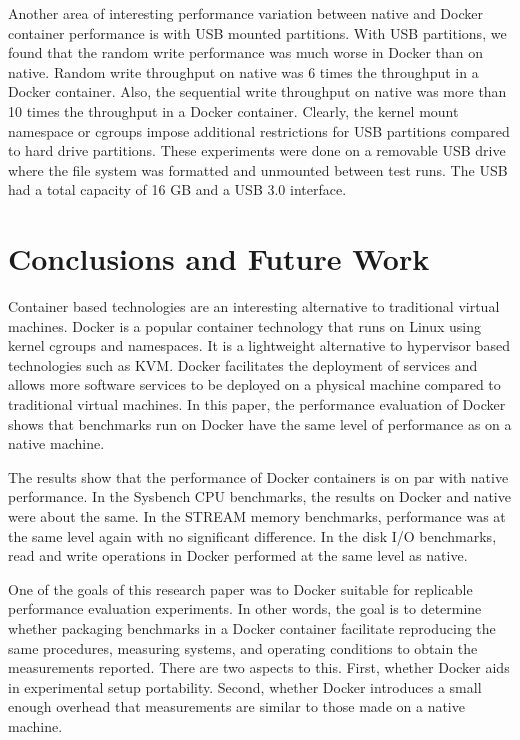 \documentclass[11pt]{article}
\begin{document}
	Another area of interesting performance variation between native and Docker container performance is with USB mounted partitions. With USB partitions, we found that the random write performance was much worse in Docker than on native. Random write throughput on native was 6 times the throughput in a Docker container. Also, the sequential write throughput on native was more than 10 times the throughput in a Docker container. Clearly, the kernel mount namespace or cgroups impose additional restrictions for USB partitions compared to hard drive partitions. These experiments were done on a removable USB drive where the file system was formatted and unmounted between test runs. The USB had a total capacity of 16 GB and a USB 3.0 interface. 
	
	\section{Conclusions and Future Work}
	
	Container based technologies are an interesting alternative to traditional virtual machines. Docker is a popular container technology that runs on Linux using kernel cgroups and namespaces. It is a lightweight alternative to hypervisor based technologies such as KVM. Docker facilitates the deployment of services and allows more software services to be deployed on a physical machine compared to traditional virtual machines. In this paper, the performance evaluation of Docker shows that benchmarks run on Docker have the same level of performance as on a native machine. 
	
	The results show that the performance of Docker containers is on par with native performance. In the Sysbench CPU benchmarks, the results on Docker and native were about the same. In the STREAM memory benchmarks, performance was at the same level again with no significant difference. In the disk I/O benchmarks, read and write operations in Docker performed at the same level as native. 
	
	One of the goals of this research paper was to Docker suitable for replicable performance evaluation experiments. In other words, the goal is to determine whether packaging benchmarks in a Docker container facilitate reproducing the same procedures, measuring systems, and operating conditions to obtain the measurements reported. There are two aspects to this. First, whether Docker aids in experimental setup portability. Second, whether Docker introduces a small enough overhead that measurements are similar to those made on a native machine. 
	
\end{document}
